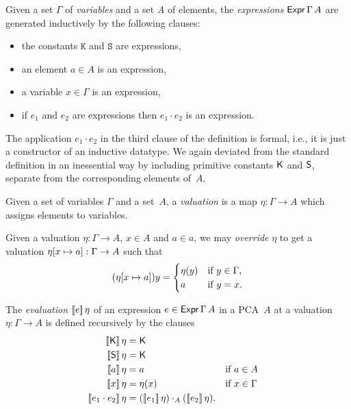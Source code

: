 \begin{definition}
  \label{def:expression}
  \leanok
  Given a set $\Gamma$ of \emph{variables} and a set $A$ of elements, the
  \emph{expressions} $\mathsf{Expr}\,\Gamma\,A$ are generated inductively by the following clauses:
  \begin{itemize}
    \item the constants $\mathtt{K}$ and $\mathtt{S}$ are expressions,
    \item an element $a \in A$ is an expression,
    \item a variable $x \in \Gamma$ is an expression,
    \item if $e_1$ and $e_2$ are expressions then $e_1 \cdot e_2$ is an expression.
  \end{itemize}
\end{definition}

\noindent
The application $e_1 \cdot e_2$ in the third clause of the definition is formal, i.e., it is just a constructor of an inductive datatype. We again deviated from the standard definition in an inessential way by including primitive constants $\mathsf{K}$ and $\mathsf{S}$, separate from the corresponding elements of~$A$.

Given a set of variables $\Gamma$ and a set~$A$, a \emph{valuation} is a map $\eta : \Gamma \to A$ which assigns elements to variables.

\begin{definition}
  \label{def:override}%
  \leanok
  Given a valuation $\eta : \Gamma \to A$, $x \in A$ and $a \in a$, we may \emph{override} $\eta$
  to get a valuation $\eta[x \mapsto a] : \Gamma \to A$ such that
  \begin{equation*}
    (\eta[x \mapsto a]) y =
    \begin{cases}
      \eta(y) &\text{if $y \in \Gamma$,}\\
      a       &\text{if $y = x$.}
    \end{cases}
  \end{equation*}
\end{definition}

\begin{definition}
  \label{def:evaluation}
  \leanok
  The \emph{evaluation} $[\![ e ]\!] \, \eta$ of an expression $e \in \mathsf{Expr}\,\Gamma\,A$ in a PCA~$A$ at a
  valuation $\eta : \Gamma \to A$ is defined recursively by the clauses
  \begin{align*}
    \eval{\combK}{\eta} &= \combK \\
    \eval{\combS}{\eta} &= \combK \\
    \eval{a}{\eta} &= a  &&\text{if $a \in A$}\\
    \eval{x}{\eta} &= \eta(x)  &&\text{if $x \in \Gamma$}\\
    \eval{e_1 \cdot e_2}{\eta} &= (\eval{e_1} \eta) \cdot_A (\eval{e_2} \eta).
  \end{align*}
\end{definition}

